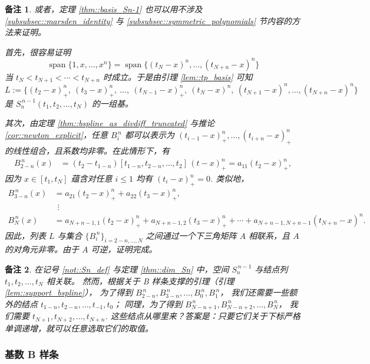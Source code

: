 \documentclass[a4paper]{ctexart}
\newtheorem{remark}{备注}
\numberwithin{theorem}{section}
\numberwithin{equation}{section}
\numberwithin{figure}{section}
\numberwithin{remark}{section}
\begin{document}
\begin{remark}
    \label{rem::alt_proof_basis}
或者，定理 \ref{thm::basis_Sn-1} 也可以用不涉及 \ref{subsubsec::marsden_identity} 与 \ref{subsubsec::symmetric_polynomials} 节内容的方法来证明。

首先，很容易证明
\[
\operatorname{span}\{1,x,\ldots,x^{n}\}
=\operatorname{span}\{(t_{N}-x)^{n},\ldots,(t_{N+n}-x)^{n}\}
\]
当 $t_N<t_{N+1}<\cdots<t_{N+n}$ 时成立。于是由引理 \ref{lem::tp_basis} 可知
\[
L:=\{(t_2-x)^{n}_{+},\ (t_3-x)^{n}_{+},\ \ldots,\ (t_{N-1}-x)^{n}_{+},\ (t_N-x)^{n},\ (t_{N+1}-x)^{n},\ldots,(t_{N+n}-x)^{n}\}
\]
是 $S^{\,n-1}_n(t_1,t_2,\ldots,t_N)$ 的一组基。

其次，由定理 \ref{thm::bspline_as_divdiff_truncated} 与推论 \ref{cor::newton_explicit}，任意 $B^{\,n}_i$ 都可以表示为
$(t_{i-1}-x)^{n}_{+},\ldots,(t_{i+n}-x)^{n}_{+}$ 的线性组合，且系数均非零。在此情形下，有
\[
\begin{aligned}
B^{\,n}_{2-n}(x)
&=(t_2-t_{1-n})[t_{1-n},t_{2-n},\ldots,t_2]\,(t-x)^{n}_{+}
=a_{11}(t_2-x)^{n}_{+},
\end{aligned}
\]
因为 $x\in [t_1,t_N]$ 蕴含对任意 $i\le 1$ 均有 $(t_i-x)^{n}_{+}=0$. 类似地，
\[
\begin{aligned}
B^{\,n}_{3-n}(x)&=a_{21}(t_2-x)^{n}_{+}+a_{22}(t_3-x)^{n}_{+},\\
&\ \ \vdots\\
B^{\,n}_{N}(x)
&=a_{N+n-1,1}(t_2-x)^{n}_{+}+a_{N+n-1,2}(t_3-x)^{n}_{+}
+\cdots+a_{N+n-1,N+n-1}(t_{N+n}-x)^{n}.
\end{aligned}
\]
因此，列表 $L$ 与集合 $\{B^{\,n}_i\}_{i=2-n,\ldots,N}$ 之间通过一个下三角矩阵 $A$ 相联系，且 $A$ 的对角元非零。由于 $A$ 可逆，证明完成。
\end{remark}

\begin{remark}
    \label{rem::extra_knots}
在记号 \ref{not::Sn_def} 与定理 \ref{thm::dim_Sn} 中，空间 $S^{\,n-1}_n$ 与结点列 $t_1,t_2,\ldots,t_N$ 相关联。
然而，根据关于 B 样条支撑的引理（引理 \ref{lem::support_bspline}），
为了得到 $B^{\,n}_{2-n}, B^{\,n}_{3-n},\ldots, B^{\,n}_{0}, B^{\,n}_{1}$，
我们还需要一些额外的结点 $t_{1-n}, t_{2-n},\ldots, t_{-1}, t_0$；
同理，为了得到 $B^{\,n}_{N-n+1}, B^{\,n}_{N-n+2},\ldots, B^{\,n}_{N}$，
我们需要 $t_{N+1}, t_{N+2},\ldots, t_{N+n}$. 
这些结点从哪里来？答案是：只要它们关于下标严格单调递增，就可以任意选取它们的取值。
\end{remark}

\subsubsection{基数 B 样条}
\end{document}
